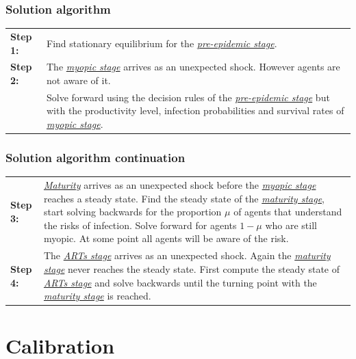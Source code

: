 \documentclass{beamer}
\begin{document}
\begin{frame}
\frametitle{Solution algorithm}
\begin{tabular}{p{2cm}p{8cm}}
\textbf{Step 1:}& Find stationary equilibrium for the \underline{\textit{pre-epidemic stage}}.\\
\textbf{Step 2:}& The \underline{\textit{myopic stage}} arrives as an unexpected shock. However agents are not aware of it.\\
& Solve forward using the decision rules of the \underline{\textit{pre-epidemic stage}} but with the productivity level, infection probabilities and survival rates of \underline{\textit{myopic stage}}. \\
\end{tabular}
\end{frame}



\begin{frame}
\frametitle{Solution algorithm continuation}
\begin{tabular}{p{2cm}p{8cm}}
\textbf{Step 3:}& \underline{\textit{Maturity}} arrives as an unexpected shock before the \underline{\textit{myopic stage}} reaches a steady state. Find the steady state of the \underline{\textit{maturity stage}}, start solving backwards for the proportion $\mu$ of agents that understand the risks of infection. Solve forward for agents $1-\mu$ who are still myopic. At some point all agents will be aware of the risk. \\
\textbf{Step 4:}& The \underline{\textit{ARTs stage}} arrives as an unexpected shock. Again the \underline{\textit{maturity stage}} never reaches the steady state. First compute the steady state of \underline{\textit{ARTs stage}} and solve backwards until the turning point with the \underline{\textit{maturity stage}} is reached.\\
\end{tabular}
\end{frame}



\section{Calibration}
\subsection{}
\end{document}
